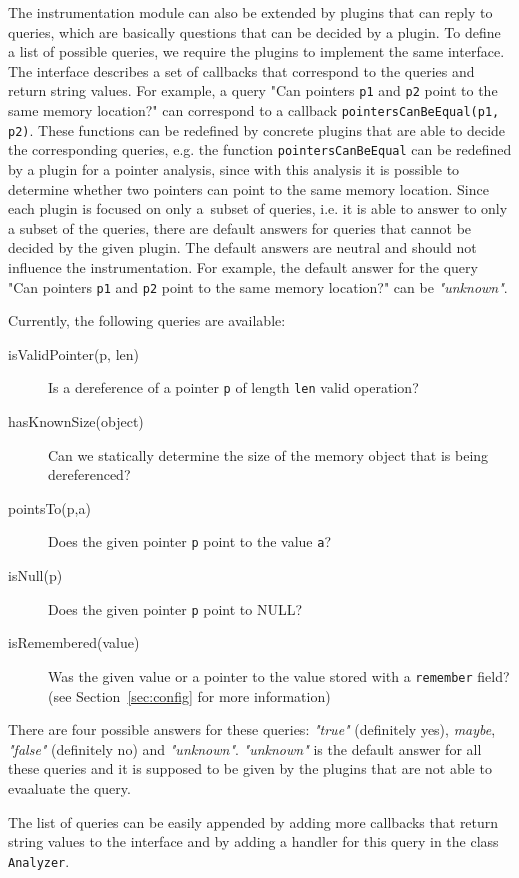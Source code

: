 The instrumentation module can also be extended by plugins that can reply to
queries, which are basically questions that can be decided by a plugin. To
define a list of possible queries, we require the plugins to implement the same
interface. The interface describes a set of callbacks that correspond to the
queries and return string values. For example, a query "Can pointers
\texttt{p1} and \texttt{p2} point to the same memory location?" can correspond
to a callback \texttt{pointersCanBeEqual(p1, p2)}. These functions can be
redefined by concrete plugins that are able to decide the corresponding
queries, e.g.  the function \texttt{pointersCanBeEqual} can be redefined by a
plugin for a pointer analysis, since with this analysis it is possible to
determine whether two pointers can point to the same memory location. Since
each plugin is focused on only a~subset of queries, i.e. it is able to answer
to only a subset of the queries, there are default answers for queries that
cannot be decided by the given plugin. The default answers are neutral and
should not influence the instrumentation. For example, the default answer for
the query "Can pointers \texttt{p1} and \texttt{p2} point to the same memory
location?" can be \emph{"unknown"}.

Currently, the following queries are available:
\begin{description}
  \item[isValidPointer(p, len)] Is a dereference of a pointer \texttt{p} of
        length \texttt{len} valid operation?
  \item[hasKnownSize(object)] Can we statically determine the size of the memory
         object that is being dereferenced?
  \item[pointsTo(p,a)] Does the given pointer \texttt{p} point to the value \texttt{a}?
  \item[isNull(p)] Does the given pointer \texttt{p} point to NULL?
  \item[isRemembered(value)] Was the given value or a pointer to the value
  stored with a \texttt{remember} field? (see Section~\ref{sec:config} for more
  information)
\end{description}
There are four possible answers for these queries: \emph{"true"} (definitely
yes), \emph{maybe}, \emph{"false"} (definitely no) and \emph{"unknown"}.
\emph{"unknown"} is the default answer for all these queries and it is supposed
to be given by the plugins that are not able to evaaluate the query.

The list of queries can be easily appended by adding more callbacks that return
string values to the interface and by  adding a
handler for this query in the class \texttt{Analyzer}.

